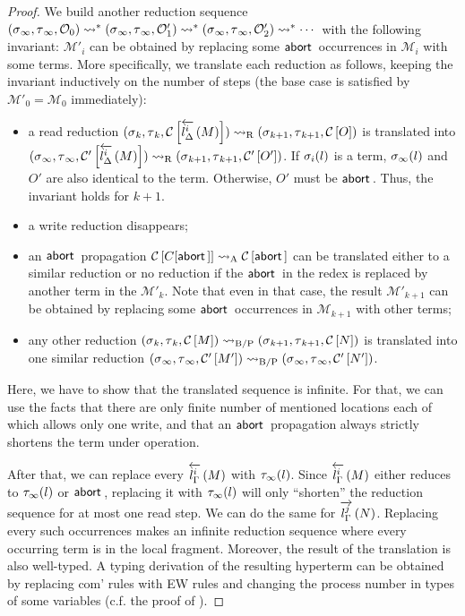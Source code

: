 {\begin{proof}
We build another reduction sequence
$
\conf{_\infty}{_\infty}{\hypert_0}
\reduce^\ast
\conf{_\infty}{_\infty}{\hypert'_1}
\reduce^\ast
\conf{_\infty}{_\infty}{\hypert'_2}
\reduce^\ast\cdots
$
with the following invariant:
$\mathcal M'_i$ can be obtained by replacing some $\abort$ occurrences
in $\mathcal M_i$ with some terms.
More specifically, we translate each reduction as follows, keeping the
invariant inductively on the number of steps
(the base case is satisfied by $\mathcal M'_0 = \mathcal M_0$ immediately):
\begin{itemize}
 \item a read reduction $\conf{_k}{_k}{\hypc{}{\rtol i l\Delta M}}
       \rreduce
       \conf{_{k+1}}{_{k+1}}{\hypc{}{O}}$ is translated into
       $\conf{_\infty}{_\infty}{\hypc'{\rtol i l\Delta M}} \rreduce
       \conf{_{k+1}}{_{k+1}}{\hypc'{O'}}$.
       If $\lstore_i(l)$ is a term,
       $\lstore_\infty(l)$ and $O'$ are also identical to the term.
       Otherwise, $O'$ must be $\abort$.
       Thus, the invariant
       holds for $k+1$.
 \item a write reduction disappears;
 \item an $\abort$ propagation
       $\hypc{}{C[\abort]} \areduce \hypc{}{\abort}$ can be translated
       either to a similar reduction or no reduction if the $\abort$ in
       the redex is replaced by another term in the $\mathcal{M'}_k$.
       Note that even in that case, the result $\mathcal{M'}_{k+1}$ can
       be obtained by replacing some $\abort$ occurrences in
       $\mathcal{M}_{k+1}$ with other terms;
 \item any other reduction $\conf{_k}{_k}{\hypc{}{M}} \bpreduce
       \conf{_{k+1}}{_{k+1}}{\hypc{}{N}}$
       is translated into one similar reduction
       $\conf{_\infty}{_\infty}{\hypc{'}{M'}}\bpreduce
        \conf{_\infty}{_\infty}{\hypc{'}{N'}}$.
\end{itemize}
Here, we have to show that the translated sequence is infinite.
 For that, we can use the facts that
 there are only finite
number of mentioned locations each of which allows only one write, and that
an $\abort$ propagation always
strictly shortens the term under operation.

 After that, we can replace
 every ${\rtol i l\Gamma M}$ with
 $\rstore_\infty(l)$.
 Since $\rtol i l\Gamma M$ either reduces to $\rstore_\infty(l)$ or $\abort$,
 replacing it with $\rstore_\infty(l)$ will only ``shorten'' the reduction
 sequence for at most one read step.
 We can do the same for $\ltor j l \Gamma N$.
 Replacing every such occurrences
 makes an infinite reduction sequence where every occurring term is
 in the local fragment.
 Moreover,
 the result of the translation is also well-typed.
 A typing derivation of the resulting hyperterm can be obtained by
 replacing com' rules with EW rules and changing the process number in
 types of some variables (c.f. the proof of ).


\end{proof}}
